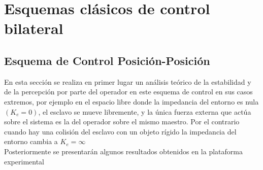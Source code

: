 \chapter{Esquemas clásicos de control bilateral }




\section{Esquema de Control Posición-Posición}
En esta sección se realiza en primer lugar un análisis teórico de la estabilidad y de la percepción por parte del operador en este esquema de control en sus casos extremos, por ejemplo en el espacio libre donde la impedancia del entorno es nula $(K_e=0)$, el esclavo se mueve libremente, y la única fuerza externa que actúa sobre el sistema es la del operador sobre el mismo maestro. Por el contrario cuando hay una colisión del esclavo con un objeto rígido la impedancia del entorno cambia a $K_e=\infty$\\

Posteriormente se presentarán algunos resultados obtenidos en la plataforma experimental

